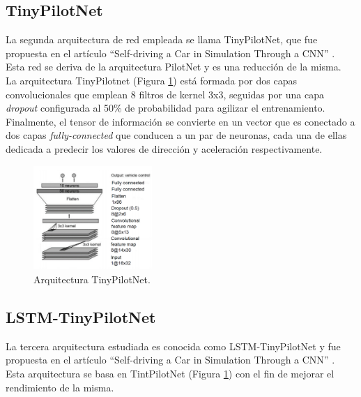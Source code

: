 \subsection{TinyPilotNet}

La segunda arquitectura de red empleada se llama TinyPilotNet, que fue propuesta en el artículo ``Self-driving a Car in Simulation Through a CNN'' \cite{self-driving}. Esta red se deriva de la arquitectura PilotNet \cite{end2end} \cite{explaining-end2end} y es una reducción de la misma.\\

La arquitectura TinyPilotnet (Figura \ref{fig.TinyPilotNet}) está formada por dos capas  convolucionales que emplean 8 filtros de kernel 3x3, seguidas por una capa \textit{dropout} configurada al 50\% de probabilidad para agilizar el entrenamiento. Finalmente, el tensor de información se convierte en un vector que es conectado a dos capas \textit{fully-connected} que conducen a un par de neuronas, cada una de ellas dedicada a predecir los valores de dirección y aceleración respectivamente.

\begin{figure}
\begin{center}
	\includegraphics[width=0.4\textwidth]{figures/Regresion/tinypilotnet.png}
   \caption{Arquitectura TinyPilotNet.}
	\label{fig.TinyPilotNet}
\end{center}
\end{figure}


\subsection{LSTM-TinyPilotNet}

La tercera arquitectura estudiada es conocida como LSTM-TinyPilotNet y fue propuesta en el artículo ``Self-driving a Car in Simulation Through a CNN'' \cite{self-driving}. Esta arquitectura se basa en TintPilotNet (Figura \ref{fig.TinyPilotNet}) con el fin de mejorar el rendimiento de la misma.\\

